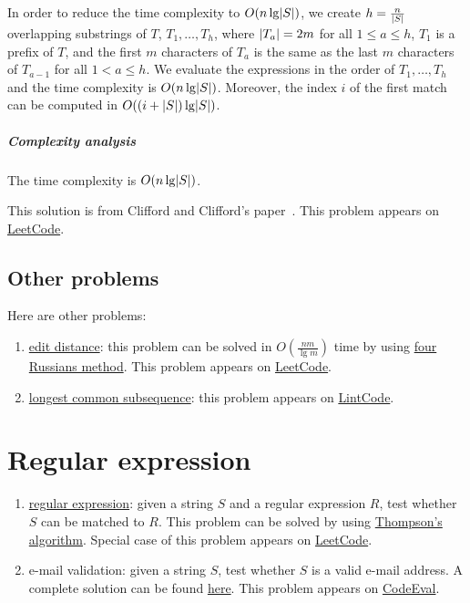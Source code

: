 \begin{Answer}
In order to reduce the time complexity to $O(n \lg \lvert S\rvert)$, we create $h = \frac{n}{\lvert S\rvert}$ overlapping substrings of $T$, $T_1, \dots, T_h$, where $\lvert T_a\rvert = 2m$ for all $1 \leq a \leq h$, $T_1$ is a prefix of $T$, and the first $m$ characters of $T_a$ is the same as the last $m$ characters of $T_{a - 1}$ for all $1 < a \leq h$.
We evaluate the expressions in the order of $T_1, \dots, T_h$ and the time complexity is $O(n \lg \lvert S\rvert)$.
Moreover, the index $i$ of the first match can be computed in $O((i + \lvert S\rvert) \lg \lvert S\rvert)$.

\subparagraph{Complexity analysis} The time complexity is $O(n \lg \lvert S\rvert)$.
\begin{remark}
This solution is from Clifford and Clifford's paper~\cite{Clifford2007}.
This problem appears on \href{https://leetcode.com/problems/wildcard-matching/}{LeetCode}.
\end{remark}
\end{Answer}

\subsection{Other problems}
Here are other problems:
\begin{enumerate}
\item \href{https://en.wikipedia.org/wiki/Edit_distance}{edit distance}: this problem can be solved in $O(\frac{nm}{\lg m})$ time by using \href{https://en.wikipedia.org/wiki/Method_of_Four_Russians}{four Russians method}. This problem appears on \href{https://leetcode.com/problems/edit-distance/}{LeetCode}.
\item \href{https://en.wikipedia.org/wiki/Longest_common_subsequence_problem}{longest common subsequence}: this problem appears on \href{http://www.lintcode.com/en/problem/longest-common-subsequence/}{LintCode}.
\end{enumerate}

\section{Regular expression}
\begin{enumerate}
\item \href{https://en.wikipedia.org/wiki/Regular_expression}{regular expression}: given a string $S$ and a regular expression $R$, test whether $S$ can be matched to $R$. This problem can be solved by using \href{https://en.wikipedia.org/wiki/Thompson\%27s_construction_algorithm}{Thompson's algorithm}. Special case of this problem appears on \href{https://leetcode.com/problems/regular-expression-matching/}{LeetCode}.
\item e-mail validation: given a string $S$, test whether $S$ is a valid e-mail address. A complete solution can be found \href{http://ex-parrot.com/~pdw/Mail-RFC822-Address.html}{here}. This problem appears on \href{https://www.codeeval.com/open_challenges/35/}{CodeEval}.
\end{enumerate}

